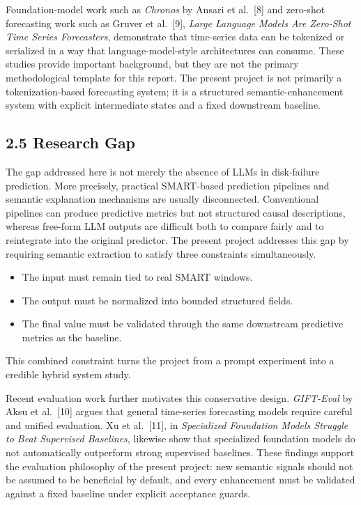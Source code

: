 \documentclass[
  11pt,
  a4paper]{article}
\providecommand{\tightlist}{%
  \setlength{\itemsep}{0pt}\setlength{\parskip}{0pt}}
\begin{document}
Foundation-model work such as \emph{Chronos} by Ansari et al.~{[}8{]}
and zero-shot forecasting work such as Gruver et al.~{[}9{]},
\emph{Large Language Models Are Zero-Shot Time Series Forecasters},
demonstrate that time-series data can be tokenized or serialized in a
way that language-model-style architectures can consume. These studies
provide important background, but they are not the primary
methodological template for this report. The present project is not
primarily a tokenization-based forecasting system; it is a structured
semantic-enhancement system with explicit intermediate states and a
fixed downstream baseline.

\hypertarget{research-gap}{%
\subsection{2.5 Research Gap}\label{research-gap}}

The gap addressed here is not merely the absence of LLMs in disk-failure
prediction. More precisely, practical SMART-based prediction pipelines
and semantic explanation mechanisms are usually disconnected.
Conventional pipelines can produce predictive metrics but not structured
causal descriptions, whereas free-form LLM outputs are difficult both to
compare fairly and to reintegrate into the original predictor. The
present project addresses this gap by requiring semantic extraction to
satisfy three constraints simultaneously.

\begin{itemize}
\tightlist
\item
  The input must remain tied to real SMART windows.
\item
  The output must be normalized into bounded structured fields.
\item
  The final value must be validated through the same downstream
  predictive metrics as the baseline.
\end{itemize}

This combined constraint turns the project from a prompt experiment into
a credible hybrid system study.

Recent evaluation work further motivates this conservative design.
\emph{GIFT-Eval} by Aksu et al.~{[}10{]} argues that general time-series
forecasting models require careful and unified evaluation. Xu et
al.~{[}11{]}, in \emph{Specialized Foundation Models Struggle to Beat
Supervised Baselines}, likewise show that specialized foundation models
do not automatically outperform strong supervised baselines. These
findings support the evaluation philosophy of the present project: new
semantic signals should not be assumed to be beneficial by default, and
every enhancement must be validated against a fixed baseline under
explicit acceptance guards.
\end{document}
